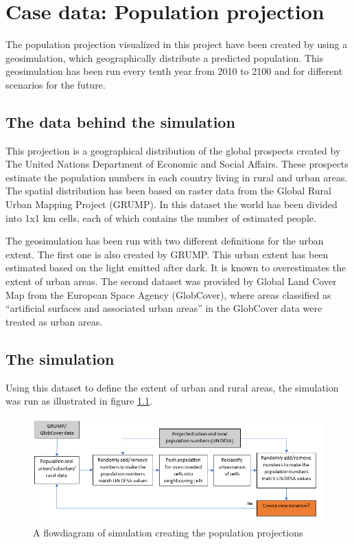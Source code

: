\chapter{Case data: Population projection}\label{CCaseData}
The population projection visualized in this project have been created by \citet{Kessler} using a geosimulation, which geographically distribute a predicted population. This geosimulation has been run every tenth year from 2010 to 2100 and for different scenarios for the future.

\section{The data behind the simulation}\label{TheDataBehind}
This projection is a geographical distribution of the global prospects created by The United Nations Department of Economic and Social Affairs. These prospects estimate the population numbers in each country living in rural and urban areas. The spatial distribution has been based on raster data from the Global Rural Urban Mapping Project (GRUMP). In this dataset the world has been divided into 1x1 km cells, each of which contains the number of estimated people. \citep{Kessler}

The geosimulation has been run with two different definitions for the urban extent. The first one is also created by GRUMP. This urban extent has been estimated based on the light emitted after dark. It is known to overestimates the extent of urban areas. \citep{Kessler}
The second dataset was provided by Global Land Cover Map from the European Space Agency (GlobCover), where areas classified as “artificial surfaces and associated urban areas” in the GlobCover data were treated as urban areas. \citep{Kessler}

\section{The simulation}
Using this dataset to define the extent of urban and rural areas, the simulation was run as illustrated in figure \ref{CreatingData}.

\begin{figure} [H]
	\centering
	\includegraphics[width=1\textwidth]{Pictures/CreatingData}
	\caption{A flowdiagram of simulation creating the population projections}
	\label{CreatingData}
\end{figure}

